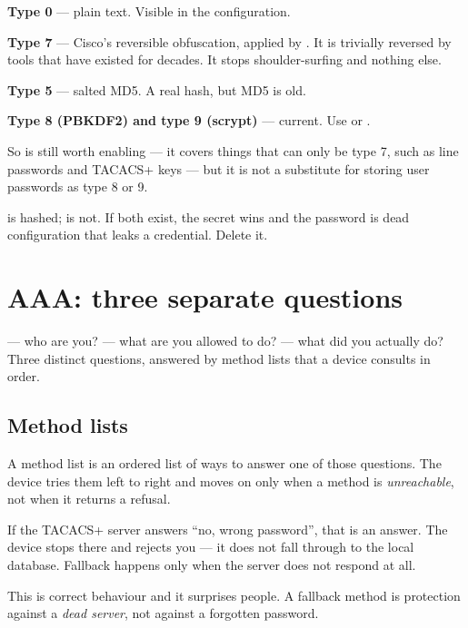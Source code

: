 \begin{conceptbox}
\begin{tight}
  \item \textbf{Type 0} --- plain text. Visible in the configuration.
  \item \textbf{Type 7} --- Cisco's reversible obfuscation, applied by
        . It is trivially reversed by tools that
        have existed for decades. It stops shoulder-surfing and nothing else.
  \item \textbf{Type 5} --- salted MD5. A real hash, but MD5 is old.
  \item \textbf{Type 8 (PBKDF2) and type 9 (scrypt)} --- current. Use
         or .
\end{tight}

So  is still worth enabling --- it covers things
that can only be type 7, such as line passwords and TACACS+ keys --- but it is
not a substitute for storing user passwords as type 8 or 9.

 is hashed;  is not. If both exist, the
secret wins and the password is dead configuration that leaks a credential.
Delete it.
\end{conceptbox}

\section{AAA: three separate questions}

\begin{definitionbox}[AAA]
 --- who are you?  --- what are you
allowed to do?  --- what did you actually do? Three distinct
questions, answered by method lists that a device consults in order.
\end{definitionbox}

\subsection{Method lists}

A method list is an ordered list of ways to answer one of those questions. The
device tries them left to right and moves on only when a method is
\emph{unreachable}, not when it returns a refusal.

\begin{alertbox}
If the TACACS+ server answers ``no, wrong password'', that is an answer. The
device stops there and rejects you --- it does not fall through to the local
database. Fallback happens only when the server does not respond at all.

This is correct behaviour and it surprises people. A fallback method is
protection against a \emph{dead server}, not against a forgotten password.
\end{alertbox}

